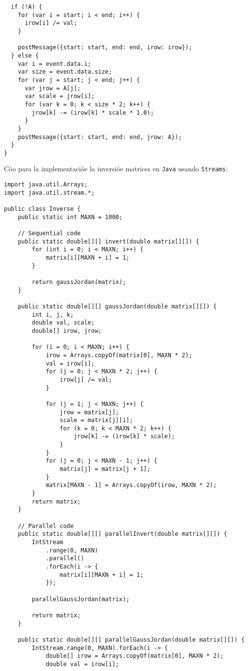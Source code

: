 \documentclass[10pt,letterpaper,oneside]{article}
\begin{document}
{\begin{verbatim}
  if (!A) {
    for (var i = start; i < end; i++) {
      irow[i] /= val;
    }

    postMessage({start: start, end: end, irow: irow});
  } else {
    var i = event.data.i;
    var size = event.data.size;
    for (var j = start; j < end; j++) {
      var jrow = A[j];
      var scale = jrow[i];
      for (var k = 0; k < size * 2; k++) {
        jrow[k] -= (irow[k] * scale * 1.0);
      }
    }
    postMessage({start: start, end: end, jrow: A});
  }
}
\end{verbatim}

Cóo para la implementacióe la inversióe matrices en \verb!Java! usando \verb!Streams!:
\begin{verbatim}
import java.util.Arrays;
import java.util.stream.*;

public class Inverse {
    public static int MAXN = 1000;

    // Sequential code
    public static double[][] invert(double matrix[][]) {
        for (int i = 0; i < MAXN; i++) {
            matrix[i][MAXN + i] = 1;
        }

        return gaussJordan(matrix);
    }

    public static double[][] gaussJordan(double matrix[][]) {
        int i, j, k;
        double val, scale;
        double[] irow, jrow;

        for (i = 0; i < MAXN; i++) {
            irow = Arrays.copyOf(matrix[0], MAXN * 2);
            val = irow[i];
            for (j = 0; j < MAXN * 2; j++) {
                irow[j] /= val;
            }

            for (j = 1; j < MAXN; j++) {
                jrow = matrix[j];
                scale = matrix[j][i];
                for (k = 0; k < MAXN * 2; k++) {
                    jrow[k] -= (irow[k] * scale);
                }
            }
            for (j = 0; j < MAXN - 1; j++) {
                matrix[j] = matrix[j + 1];
            }
            matrix[MAXN - 1] = Arrays.copyOf(irow, MAXN * 2);
        }
        return matrix;
    }

    // Parallel code
    public static double[][] parallelInvert(double matrix[][]) {
        IntStream
            .range(0, MAXN)
            .parallel()
            .forEach(i -> {
                matrix[i][MAXN + i] = 1;
            });

        parallelGaussJordan(matrix);

        return matrix;
    }

    public static double[][] parallelGaussJordan(double matrix[][]) {
        IntStream.range(0, MAXN).forEach(i -> {
            double[] irow = Arrays.copyOf(matrix[0], MAXN * 2);
            double val = irow[i];


\end{verbatim}}
\end{document}

